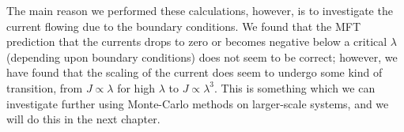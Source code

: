 The main reason we performed these calculations, however, is to investigate the current flowing due
to the boundary conditions. We found that the MFT prediction that the currents drops to zero or becomes 
negative below a critical $\lambda$ (depending upon boundary conditions) does not seem to be correct;
however, we have found that the scaling of the current does seem to undergo some kind of transition,
from  $J \propto \lambda$ for high $\lambda$ to $J \propto \lambda^3$. This is something which we can
investigate further using Monte-Carlo methods on larger-scale systems, and we will do this in the next
chapter.

